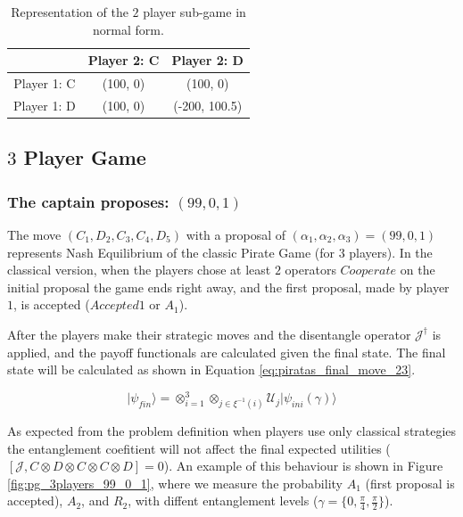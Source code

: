 \begin{table}[h]
\begin{center}
\begin{centering}
\begin{tabular}{ccc}
\hline 
  & Player 2: C & Player 2: D\tabularnewline
\hline 
Player 1: C & (100, 0) & (100, 0)\tabularnewline
Player 1: D & (100, 0) & (-200, 100.5)\tabularnewline
\hline 
\end{tabular}

\par\end{centering}
\caption{Representation of the $2$ player sub-game in normal form.}
\label{tab:classico2jogadores_analise}
\end{center}



\subsection{$3$ Player Game}
\label{subsec:3playergame}


\subsubsection{The captain proposes: $(99, 0, 1)$}
\label{subsubsec:3playergame99}

The move $(C_1,D_2,C_3,C_4,D_5)$ with a proposal of $(\alpha_{1}, \alpha_{2}, \alpha_{3}) =(99, 0, 1)$ represents Nash Equilibrium of the classic Pirate Game (for $3$ players). In the classical version, when the players chose at least $2$ operators $Cooperate$ on the initial proposal the game ends right away, and the first proposal, made by player $1$, is accepted ($Accepted 1$ or $A_{1}$).

After the players make their strategic moves and the disentangle operator $\mathcal{J}^{\dagger}$ is applied, and the payoff functionals are calculated given the final state. The final state will be calculated as shown in Equation \ref{eq:piratas_final_move_23}.

\begin{equation}
\vert\psi_{fin}\rangle=\otimes_{i=1}^{3}\otimes_{j\in\xi^{-1}(i)}\mathcal{U}_{j}\vert\psi_{ini}(\gamma)\rangle
\label{eq:piratas_final_move_23}
\end{equation} 

As expected from the problem definition when players use only classical strategies the entanglement coefitient will not affect the final expected utilities ($[ \mathcal{J} , C \otimes D \otimes C \otimes C \otimes D ] = 0 $).
An example of this behaviour is shown in Figure \ref{fig:pg_3players_99_0_1}, where we measure the probability $A_{1}$ (first proposal is accepted), $A_{2}$, and $R_{2}$, with diffent entanglement levels ($\gamma= \{ 0 , \frac{ \pi}{4}, \frac{\pi}{2} \} $).


\end{table}
